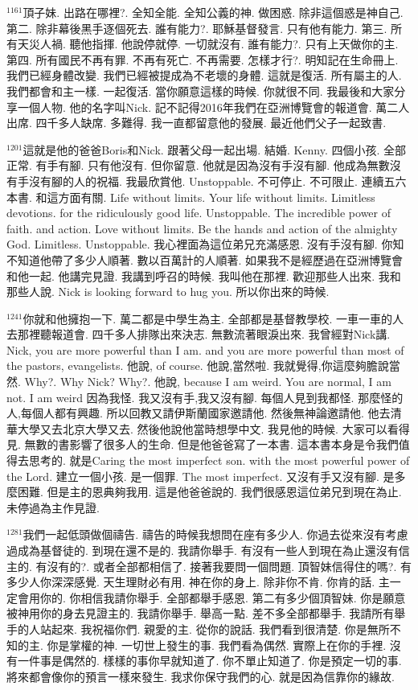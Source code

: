 \documentclass{book}
\begin{document}
$^{1161}$頂子妹.
出路在哪裡?.
全知全能.
全知公義的神.
做困惑.
除非這個惑是神自己.
第二.
除非幕後黑手逐個死去.
誰有能力?.
耶穌基督發言.
只有他有能力.
第三.
所有天災人禍.
聽他指揮.
他說停就停.
一切就沒有.
誰有能力?.
只有上天做你的主.
第四.
所有國民不再有罪.
不再有死亡.
不再需要.
怎樣才行?.
明知記在生命冊上.
我們已經身體改變.
我們已經被提成為不老壞的身體.
這就是復活.
所有屬主的人.
我們都會和主一樣.
一起復活.
當你願意這樣的時候.
你就很不同.
我最後和大家分享一個人物.
他的名字叫Nick.
記不記得2016年我們在亞洲博覽會的報道會.
萬二人出席.
四千多人缺席.
多難得.
我一直都留意他的發展.
最近他們父子一起致書.

$^{1201}$這就是他的爸爸Boris和Nick.
跟著父母一起出場.
結婚.
Kenny.
四個小孩.
全部正常.
有手有腳.
只有他沒有.
但你留意.
他就是因為沒有手沒有腳.
他成為無數沒有手沒有腳的人的祝福.
我最欣賞他.
Unstoppable.
不可停止.
不可限止.
連續五六本書.
和這方面有關.
Life without limits.
Your life without limits.
Limitless devotions.
for the ridiculously good life.
Unstoppable.
The incredible power of faith.
and action.
Love without limits.
Be the hands and action of the almighty God.
Limitless.
Unstoppable.
我心裡面為這位弟兄充滿感恩.
沒有手沒有腳.
你知不知道他帶了多少人順著.
數以百萬計的人順著.
如果我不是經歷過在亞洲博覽會和他一起.
他講完見證.
我講到呼召的時候.
我叫他在那裡.
歡迎那些人出來.
我和那些人說.
Nick is looking forward to hug you.
所以你出來的時候.

$^{1241}$你就和他擁抱一下.
萬二都是中學生為主.
全部都是基督教學校.
一車一車的人去那裡聽報道會.
四千多人排隊出來決志.
無數流著眼淚出來.
我曾經對Nick講.
Nick, you are more powerful than I am.
and you are more powerful than most of the pastors, evangelists.
他說, of course.
他說,當然啦.
我就覺得,你這麼夠膽說當然.
Why?.
Why Nick? Why?.
他說, because I am weird.
You are normal, I am not.
I am weird 因為我怪.
我又沒有手,我又沒有腳.
每個人見到我都怪.
那麼怪的人,每個人都有興趣.
所以回教又請伊斯蘭國家邀請他.
然後無神論邀請他.
他去清華大學又去北京大學又去.
然後他說他當時想學中文.
我見他的時候.
大家可以看得見.
無數的書影響了很多人的生命.
但是他爸爸寫了一本書.
這本書本身是令我們值得去思考的.
就是Caring the most imperfect son.
with the most powerful power of the Lord.
建立一個小孩.
是一個罪.
The most imperfect.
又沒有手又沒有腳.
是多麼困難.
但是主的恩典夠我用.
這是他爸爸說的.
我們很感恩這位弟兄到現在為止.
未停過為主作見證.

$^{1281}$我們一起低頭做個禱告.
禱告的時候我想問在座有多少人.
你過去從來沒有考慮過成為基督徒的.
到現在還不是的.
我請你舉手.
有沒有一些人到現在為止還沒有信主的.
有沒有的?.
或者全部都相信了.
接著我要問一個問題.
頂智妹信得住的嗎?.
有多少人你深深感覺.
天生理財必有用.
神在你的身上.
除非你不肯.
你肯的話.
主一定會用你的.
你相信我請你舉手.
全部都舉手感恩.
第二有多少個頂智妹.
你是願意被神用你的身去見證主的.
我請你舉手.
舉高一點.
差不多全部都舉手.
我請所有舉手的人站起來.
我祝福你們.
親愛的主.
從你的說話.
我們看到很清楚.
你是無所不知的主.
你是掌權的神.
一切世上發生的事.
我們看為偶然.
實際上在你的手裡.
沒有一件事是偶然的.
樣樣的事你早就知道了.
你不單止知道了.
你是預定一切的事.
將來都會像你的預言一樣來發生.
我求你保守我們的心.
就是因為信靠你的緣故.
\end{document}
